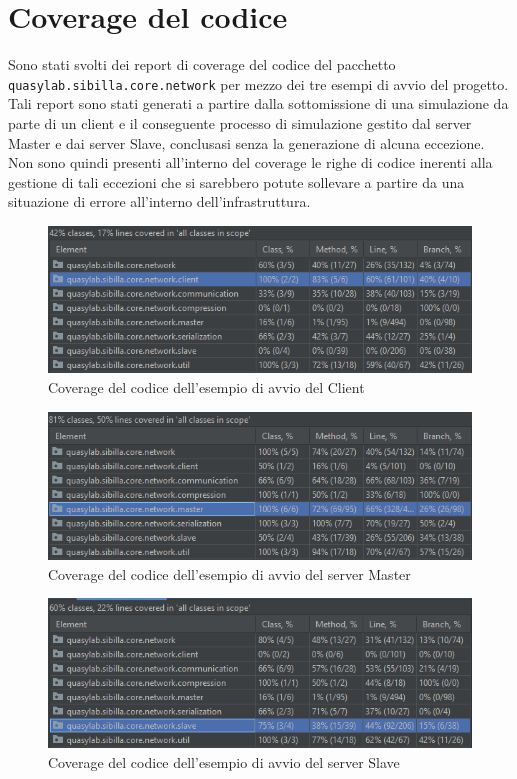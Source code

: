 \section{Coverage del codice}

Sono stati svolti dei report di coverage del codice del pacchetto \texttt{quasylab.sibilla.core.network} per mezzo dei tre esempi di avvio del progetto. Tali report sono stati generati a partire dalla sottomissione di una simulazione da parte di un client e il conseguente processo di simulazione gestito dal server Master e dai server Slave, conclusasi senza la generazione di alcuna eccezione. Non sono quindi presenti all'interno del coverage le righe di codice inerenti alla gestione di tali eccezioni che si sarebbero potute sollevare a partire da una situazione di errore all'interno dell'infrastruttura.

\begin{figure}[H]
    \includegraphics[width=\linewidth]{images/client_coverage.PNG}
    \captionsetup{justification=centering}
    \caption{Coverage del codice dell'esempio di avvio del Client}
  \end{figure}
  \begin{figure}[H]
    \includegraphics[width=\linewidth]{images/master_coverage.PNG}
    \captionsetup{justification=centering}
    \caption{Coverage del codice dell'esempio di avvio del server Master}
  \end{figure}
  \begin{figure}[H]
    \includegraphics[width=\linewidth]{images/slave_coverage.PNG}
    \captionsetup{justification=centering}
    \caption{Coverage del codice dell'esempio di avvio del server Slave}
  \end{figure}